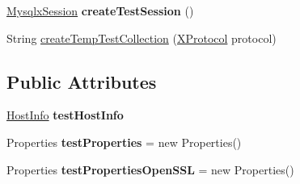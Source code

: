 \begin{DoxyCompactItemize}
\item 
\mbox{\label{classtestsuite_1_1x_1_1internal_1_1_internal_x_base_test_case_a301d976a3cdb46f5072dc0a12d10d205}} 
\mbox{\hyperlink{classcom_1_1mysql_1_1cj_1_1_mysqlx_session}{Mysqlx\+Session}} {\bfseries create\+Test\+Session} ()
\item 
String \mbox{\hyperlink{classtestsuite_1_1x_1_1internal_1_1_internal_x_base_test_case_a4cb907ae189f6df0d2bc07441c53a8fd}{create\+Temp\+Test\+Collection}} (\mbox{\hyperlink{classcom_1_1mysql_1_1cj_1_1protocol_1_1x_1_1_x_protocol}{X\+Protocol}} protocol)
\end{DoxyCompactItemize}
\subsection*{Public Attributes}
\begin{DoxyCompactItemize}
\item 
\mbox{\label{classtestsuite_1_1x_1_1internal_1_1_internal_x_base_test_case_a0f092b9a4e2c943508f9c4c09c185c86}} 
\mbox{\hyperlink{classcom_1_1mysql_1_1cj_1_1conf_1_1_host_info}{Host\+Info}} {\bfseries test\+Host\+Info}
\item 
\mbox{\label{classtestsuite_1_1x_1_1internal_1_1_internal_x_base_test_case_a74244485aa21e7d7e8379b046ccc2f55}} 
Properties {\bfseries test\+Properties} = new Properties()
\item 
\mbox{\label{classtestsuite_1_1x_1_1internal_1_1_internal_x_base_test_case_a92fe3eaac36627c36d450017d7337cb2}} 
Properties {\bfseries test\+Properties\+Open\+S\+SL} = new Properties()
\end{DoxyCompactItemize}
